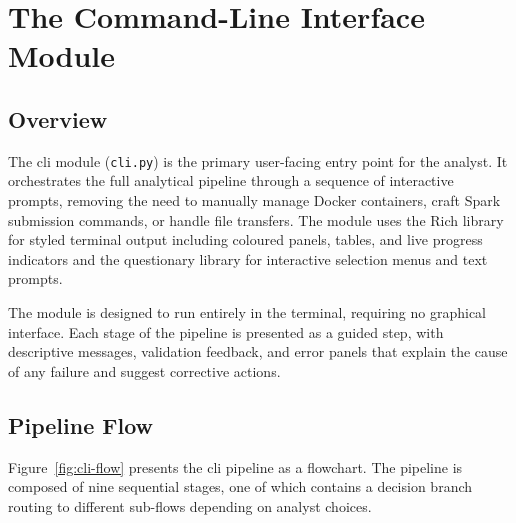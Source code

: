\section{The Command-Line Interface Module}
\label{sec:cli-module}

\subsection{Overview}
\label{subsec:cap4-overview}

The \gls{cli} module (\texttt{cli.py}) is the primary user-facing entry point for the analyst. It
orchestrates the full analytical pipeline through a sequence of interactive prompts, removing the
need to manually manage Docker containers, craft Spark submission commands, or handle file
transfers. The module uses the Rich library \parencite{willmcgugan2024rich} for styled terminal
output including coloured panels, tables, and live progress indicators and the questionary
library \parencite{questionary2024} for interactive selection menus and text prompts.

The module is designed to run entirely in the terminal, requiring no graphical interface. Each
stage of the pipeline is presented as a guided step, with descriptive messages, validation
feedback, and error panels that explain the cause of any failure and suggest corrective actions.

\subsection{Pipeline Flow}
\label{subsec:cap4-pipeline-flow}

Figure~\ref{fig:cli-flow} presents the \gls{cli} pipeline as a flowchart. The pipeline is composed
of nine sequential stages, one of which contains a decision branch routing to different sub-flows
depending on analyst choices.

